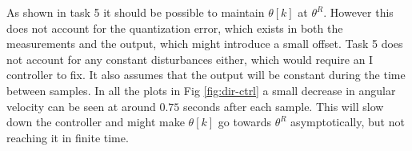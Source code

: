 As shown in task 5 it should be possible to maintain $\theta[k]$ at $\theta^R.$ However this does not account for the quantization error, which exists in both the measurements and the output, which might introduce a small offset. Task 5 does not account for any constant disturbances either, which would require an I controller to fix. It also assumes that the output will be constant during the time between samples. In all the plots in Fig \ref{fig:dir-ctrl} a small decrease in angular velocity can be seen at around $0.75$ seconds after each sample. This will slow down the controller and might make $\theta[k]$ go towards $\theta^R$ asymptotically, but not reaching it in finite time. 
